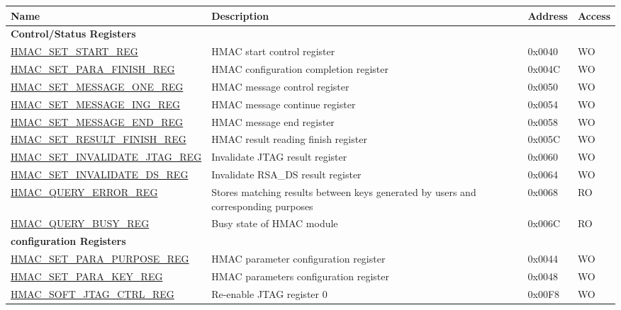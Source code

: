 \begin{longtable}{ | p{6cm} | p{7.2cm} | p{1.3cm} | p{1cm} | }
\hline\rowcolor{lightgray}
Name & Description &  Address & Access \\ \hline
\endhead
\multicolumn{4}{|l|}{\textbf{Control/Status Registers}} \\ \hline
\hyperref[regdesc:HMACSETSTARTREG]{HMAC\_SET\_START\_REG} & HMAC start control register & 0x0040 & WO \\ \hline
\hyperref[regdesc:HMACSETPARAFINISHREG]{HMAC\_SET\_PARA\_FINISH\_REG} & HMAC configuration completion register & 0x004C & WO \\ \hline
\hyperref[regdesc:HMACSETMESSAGEONEREG]{HMAC\_SET\_MESSAGE\_ONE\_REG} & HMAC message control register & 0x0050 & WO \\ \hline
\hyperref[regdesc:HMACSETMESSAGEINGREG]{HMAC\_SET\_MESSAGE\_ING\_REG} & HMAC message continue register & 0x0054 & WO \\ \hline
\hyperref[regdesc:HMACSETMESSAGEENDREG]{HMAC\_SET\_MESSAGE\_END\_REG} & HMAC message end register & 0x0058 & WO \\ \hline
\hyperref[regdesc:HMACSETRESULTFINISHREG]{HMAC\_SET\_RESULT\_FINISH\_REG} & HMAC result reading finish register & 0x005C & WO \\ \hline
\hyperref[regdesc:HMACSETINVALIDATEJTAGREG]{HMAC\_SET\_INVALIDATE\_JTAG\_REG} & Invalidate JTAG result register & 0x0060 & WO \\ \hline
\hyperref[regdesc:HMACSETINVALIDATEDSREG]{HMAC\_SET\_INVALIDATE\_DS\_REG} & Invalidate RSA\_DS result register & 0x0064 & WO \\ \hline
\hyperref[regdesc:HMACQUERYERRORREG]{HMAC\_QUERY\_ERROR\_REG} & Stores matching results between keys generated by users and corresponding purposes & 0x0068 & RO \\ \hline
\hyperref[regdesc:HMACQUERYBUSYREG]{HMAC\_QUERY\_BUSY\_REG} & Busy state of HMAC module & 0x006C & RO \\ \hline
\multicolumn{4}{|l|}{\textbf{configuration Registers}} \\ \hline
\hyperref[regdesc:HMACSETPARAPURPOSEREG]{HMAC\_SET\_PARA\_PURPOSE\_REG} & HMAC parameter configuration register & 0x0044 & WO \\ \hline
\hyperref[regdesc:HMACSETPARAKEYREG]{HMAC\_SET\_PARA\_KEY\_REG} & HMAC parameters configuration register & 0x0048 & WO \\ \hline
\hyperref[regdesc:HMACSOFTJTAGCTRLREG]{HMAC\_SOFT\_JTAG\_CTRL\_REG} & Re-enable JTAG register 0 & 0x00F8 & WO

\end{longtable}
